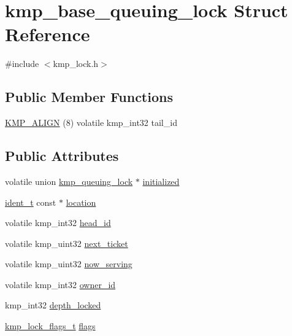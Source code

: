 \hypertarget{structkmp__base__queuing__lock}{\section{kmp\-\_\-base\-\_\-queuing\-\_\-lock Struct Reference}
\label{structkmp__base__queuing__lock}
}


{\ttfamily \#include $<$kmp\-\_\-lock.\-h$>$}

\subsection*{Public Member Functions}
\begin{DoxyCompactItemize}
\item 
\hyperlink{structkmp__base__queuing__lock_a68535b399c620f671986d9e25bc901c7}{K\-M\-P\-\_\-\-A\-L\-I\-G\-N} (8) volatile kmp\-\_\-int32 tail\-\_\-id
\end{DoxyCompactItemize}
\subsection*{Public Attributes}
\begin{DoxyCompactItemize}
\item 
volatile union \hyperlink{unionkmp__queuing__lock}{kmp\-\_\-queuing\-\_\-lock} $\ast$ \hyperlink{structkmp__base__queuing__lock_ad48bdf610c8430b474d0ae77b818c8f2}{initialized}
\item 
\hyperlink{group__BASIC__TYPES_ga690fda6b92f039a72db263c6b4394ddb}{ident\-\_\-t} const $\ast$ \hyperlink{structkmp__base__queuing__lock_a68cbb904df318e4e669d1ba3b1562c56}{location}
\item 
volatile kmp\-\_\-int32 \hyperlink{structkmp__base__queuing__lock_a7394dd8dc4fcc01f0ca8acda1a2ac82a}{head\-\_\-id}
\item 
volatile kmp\-\_\-uint32 \hyperlink{structkmp__base__queuing__lock_a3fe180e67160e4ffc68fe94cd502e517}{next\-\_\-ticket}
\item 
volatile kmp\-\_\-uint32 \hyperlink{structkmp__base__queuing__lock_aefbcb3d6e899551ed7ae3f2f7dfb4406}{now\-\_\-serving}
\item 
volatile kmp\-\_\-int32 \hyperlink{structkmp__base__queuing__lock_a26c7922624855130950f47f0d41c5b78}{owner\-\_\-id}
\item 
kmp\-\_\-int32 \hyperlink{structkmp__base__queuing__lock_aeb4369f909fac2f5a9b2c728153b1f27}{depth\-\_\-locked}
\item 
\hyperlink{kmp__lock_8h_aa9a2d4f195809e8574655b5eda034db7}{kmp\-\_\-lock\-\_\-flags\-\_\-t} \hyperlink{structkmp__base__queuing__lock_a7a852c13f6838e44d2ef503d98420f2c}{flags}
\end{DoxyCompactItemize}


